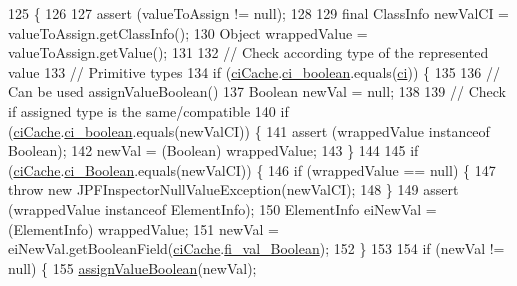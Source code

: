 \begin{DoxyCode}
125                                                                                                    \{
126 
127     assert (valueToAssign != null);
128 
129     \textcolor{keyword}{final} ClassInfo newValCI = valueToAssign.getClassInfo();
130     Object wrappedValue = valueToAssign.getValue();
131 
132     \textcolor{comment}{// Check according type of the represented value}
133     \textcolor{comment}{// Primitive types}
134     \textcolor{keywordflow}{if} (\hyperlink{classgov_1_1nasa_1_1jpf_1_1inspector_1_1server_1_1programstate_1_1_state_value_a38182b5018580765f3f2cdc9e96e1ca2}{ciCache}.\hyperlink{classgov_1_1nasa_1_1jpf_1_1inspector_1_1utils_1_1_class_info_cache_a437835d06c0658d7f01e051329a71582}{ci\_boolean}.equals(\hyperlink{classgov_1_1nasa_1_1jpf_1_1inspector_1_1server_1_1programstate_1_1_state_value_a0eb4aa1e630ed6372dcfb8c41ae7edc5}{ci})) \{
135 
136       \textcolor{comment}{// Can be used assignValueBoolean()}
137       Boolean newVal = null;
138 
139       \textcolor{comment}{// Check if assigned type is the same/compatible}
140       \textcolor{keywordflow}{if} (\hyperlink{classgov_1_1nasa_1_1jpf_1_1inspector_1_1server_1_1programstate_1_1_state_value_a38182b5018580765f3f2cdc9e96e1ca2}{ciCache}.\hyperlink{classgov_1_1nasa_1_1jpf_1_1inspector_1_1utils_1_1_class_info_cache_a437835d06c0658d7f01e051329a71582}{ci\_boolean}.equals(newValCI)) \{
141         assert (wrappedValue instanceof Boolean);
142         newVal = (Boolean) wrappedValue;
143       \}
144 
145       \textcolor{keywordflow}{if} (\hyperlink{classgov_1_1nasa_1_1jpf_1_1inspector_1_1server_1_1programstate_1_1_state_value_a38182b5018580765f3f2cdc9e96e1ca2}{ciCache}.\hyperlink{classgov_1_1nasa_1_1jpf_1_1inspector_1_1utils_1_1_class_info_cache_a3566b05065e222a8863f2f435218017e}{ci\_Boolean}.equals(newValCI)) \{
146         \textcolor{keywordflow}{if} (wrappedValue == null) \{
147           \textcolor{keywordflow}{throw} \textcolor{keyword}{new} JPFInspectorNullValueException(newValCI);
148         \}
149         assert (wrappedValue instanceof ElementInfo);
150         ElementInfo eiNewVal = (ElementInfo) wrappedValue;
151         newVal = eiNewVal.getBooleanField(\hyperlink{classgov_1_1nasa_1_1jpf_1_1inspector_1_1server_1_1programstate_1_1_state_value_a38182b5018580765f3f2cdc9e96e1ca2}{ciCache}.\hyperlink{classgov_1_1nasa_1_1jpf_1_1inspector_1_1utils_1_1_class_info_cache_aea1485827331acbf1949153cfa1b2064}{fi\_val\_Boolean});
152       \}
153 
154       \textcolor{keywordflow}{if} (newVal != null) \{
155         \hyperlink{classgov_1_1nasa_1_1jpf_1_1inspector_1_1server_1_1programstate_1_1_state_value_af9274e614eeb314bc9a4d9a3ab12a933}{assignValueBoolean}(newVal);

\end{DoxyCode}
